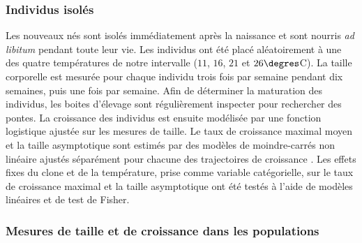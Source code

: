 \subsubsection{Individus isolés}

Les nouveaux nés sont isolés immédiatement après la naissance et sont nourris
\textit{ad libitum} pendant toute leur vie. Les individus ont été placé
aléatoirement à une des quatre températures de notre intervalle ($11$, $16$, $21$ et
$26\degres$C). La taille corporelle est mesurée pour chaque individu trois fois
par semaine pendant dix semaines, puis une fois par semaine. Afin de déterminer
la maturation des individus, les boites d'élevage sont régulièrement inspecter
pour rechercher des pontes. La croissance des individus est ensuite modélisée
par une fonction logistique ajustée sur les mesures de taille. Le taux de
croissance maximal moyen et la taille asymptotique sont estimés par des modèles
de moindre-carrés non linéaire ajustés séparément pour chacune des trajectoires
de croissance \autocites{pinheiro2000a}. Les effets fixes du clone et de la
température, prise comme variable catégorielle, sur le taux de croissance
maximal et la taille asymptotique ont été testés à l'aide de modèles linéaires
et de test de Fisher.

\subsubsection{Mesures de taille et de croissance dans les populations}
